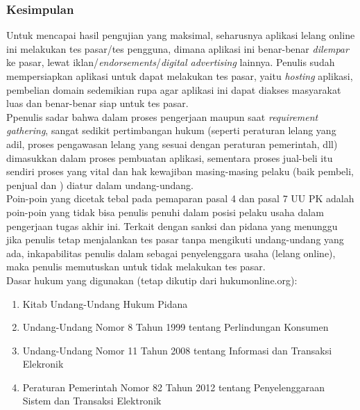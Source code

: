 \subsubsection{Kesimpulan}
	\indent Untuk mencapai hasil pengujian yang maksimal, seharusnya aplikasi lelang online ini melakukan tes pasar/tes pengguna, dimana aplikasi ini benar-benar \textit{dilempar} ke pasar, lewat iklan/\textit{endorsements}/\textit{digital advertising} lainnya. Penulis sudah mempersiapkan aplikasi untuk dapat melakukan tes pasar, yaitu \textit{hosting} aplikasi, pembelian domain sedemikian rupa agar aplikasi ini dapat diakses masyarakat luas dan benar-benar siap untuk tes pasar.\\
	\indent Ppenulis sadar bahwa dalam proses pengerjaan maupun saat \textit{requirement gathering}, sangat sedikit pertimbangan hukum (seperti peraturan lelang yang adil, proses pengawasan lelang yang sesuai dengan peraturan pemerintah, dll) dimasukkan dalam proses pembuatan aplikasi, sementara proses jual-beli itu sendiri proses yang vital dan hak kewajiban masing-masing pelaku (baik pembeli, penjual dan ) diatur dalam undang-undang. \\ 
	\indent Poin-poin yang dicetak tebal pada pemaparan pasal 4 dan pasal 7 UU PK adalah poin-poin yang tidak bisa penulis penuhi dalam posisi pelaku usaha dalam pengerjaan tugas akhir ini. Terkait dengan sanksi dan pidana yang menunggu jika penulis tetap menjalankan tes pasar tanpa mengikuti undang-undang yang ada, inkapabilitas penulis dalam sebagai penyelenggara usaha (lelang online), maka penulis memutuskan untuk tidak melakukan tes pasar.
	\\

	Dasar hukum yang digunakan (tetap dikutip dari hukumonline.org):
	\begin{enumerate}
		\item Kitab Undang-Undang Hukum Pidana
		\item Undang-Undang Nomor 8 Tahun 1999 tentang Perlindungan Konsumen
		\item Undang-Undang Nomor 11 Tahun 2008 tentang Informasi dan Transaksi Elekronik
		\item Peraturan Pemerintah Nomor 82 Tahun 2012 tentang Penyelenggaraan Sistem dan Transaksi Elektronik
	\end{enumerate}